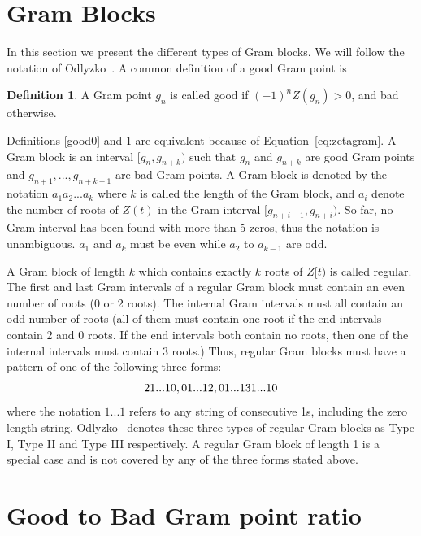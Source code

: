 \documentclass[twoside]{article}
\theoremstyle{definition}
\newtheorem{defn}{Definition}
\begin{document}
\section{\label{sec4}Gram Blocks}


In this section we present the different types of Gram blocks. We will follow the notation of   Odlyzko~\cite{Odlyzko 1992}. A common definition of a good Gram point is
\begin{defn}\label{good1}
A Gram point $g_n$ is called good if $(-1)^nZ(g_n) > 0$, and bad otherwise.
\end{defn}

Definitions \ref{good0} and \ref{good1} are equivalent because of Equation~\ref{eq:zetagram}.
A Gram block is an interval $[g_n, g_{n+k})$ such that $g_n$  and $g_{n+k}$ are good Gram points 
and $g_{n+1}, . . ., g_{n+k-1}$ are bad Gram points. A Gram block is denoted by the notation $a_1a_2 . . . a_k$ where $k$ is called the length of the Gram block, and $a_i$ denote the number of roots of $Z(t)$ in the Gram interval $[g_{n+i-1}, g_{n+i})$. So far, no Gram interval has been found with more than 5 zeros, thus the notation is unambiguous. $a_1$ and $a_k$ must be even while  $a_2$ to $a_{k-1}$ are odd.

A Gram block of length $k$ which contains exactly $k$ roots of $Z[t)$ is called regular. The first and last Gram intervals of a regular Gram block must contain an even number of roots (0 or 2 roots). 
The internal Gram intervals must all contain an odd number of roots (all of them must contain one root if the end intervals contain 2 and 0 roots. If the end intervals both contain no roots, then one of the internal intervals must contain 3 roots.) 
Thus, regular Gram blocks must have a pattern of one of the following three forms:
\begin{equation}
21 . . . 10,\\
 01 . . . 12, \\
 01 . . . 131 . . . 10
\label{types}
\end{equation}
where the notation $1 . . . 1$ refers to any string of consecutive 1s, including the zero length string. Odlyzko~\cite{Odlyzko 1992} denotes these three types of regular Gram blocks as Type I, Type II and Type III respectively.  A regular Gram block of length 1 is a special case and is not covered by any of the three forms stated above. 

\section{\label{sec5}Good to Bad Gram point ratio}
\end{document}
